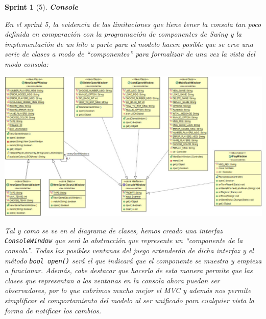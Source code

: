 \documentclass[12pt,a4paper,openright]{book}
\theoremstyle{break}
\newtheorem*{sprint}{Sprint}
\begin{document}
\begin{sprint}[5]
\textbf{Console}

En el sprint 5, la evidencia de las limitaciones que tiene tener la consola tan poco definida en comparación con la programación de componentes de \textit{Swing} y la implementación de un hilo a parte para el modelo hacen posible que se cree una serie de clases a modo de ``componentes'' para formalizar de una vez la vista del modo consola:
\begin{center}
\includegraphics[scale=0.55, angle=90]{DiagramaClasesConsola}
\end{center}
Tal y como se ve en el diagrama de clases, hemos creado una interfaz \texttt{ConsoleWindow} que será la abstracción que represente un ``componente de la consola''. Todas las posibles ventanas del juego extenderán de dicha interfaz y el método \texttt{bool open()} será el que indicará que el componente se muestra y empieza a funcionar. Además, cabe destacar que hacerlo de esta manera permite que las clases que representan a las ventanas en la consola ahora puedan ser observadores, por lo que cubrimos mucho mejor el \textit{MVC} y además nos permite simplificar el comportamiento del modelo al ser unificado para cualquier vista la forma de notificar los cambios.


\end{sprint}
\end{document}
